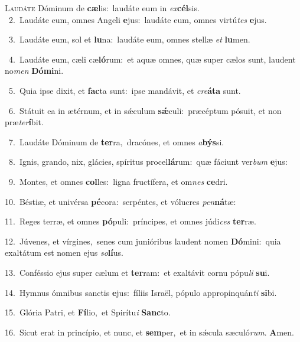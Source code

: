 \lettrine{\initial\textcolor{\initialcolor}{L}}{audáte} Dóminum de \textbf{cæ}\-lis:~\star laudáte eum in \textit{ex}\-\textbf{cél}sis.\\
{\numbfont\textcolor{\numbcolor}{~2.}}~Laudáte eum, omnes Angeli \textbf{e}\-jus:~\star laudáte eum, omnes virtú\textit{tes} \textbf{e}\-jus.\par
{\numbfont\textcolor{\numbcolor}{~3.}}~Laudáte eum, sol et \textbf{lu}\-na:~\star laudáte eum, omnes stellæ \textit{et} \textbf{lu}\-men.\par
{\numbfont\textcolor{\numbcolor}{~4.}}~Laudáte eum, cæli cæ\-\textbf{ló}\-rum:~\star et aquæ omnes, quæ super cælos sunt, laudent no\textit{men} \textbf{Dó}\-\textbf{mi}ni.\par
{\numbfont\textcolor{\numbcolor}{~5.}}~Quia ipse dixit, et \textbf{fac}\-ta sunt:~\star ipse mandávit, et \textit{cre}\-\textbf{á}\textbf{ta} sunt.\par
{\numbfont\textcolor{\numbcolor}{~6.}}~Státuit ea in ætérnum, et in sǽculum \textbf{sǽ}\-culi:~\star præcéptum pósuit, et non præ\-\textit{ter}\-\textbf{í}bit.\par
{\numbfont\textcolor{\numbcolor}{~7.}}~Laudáte Dóminum de \textbf{ter}\-ra,~\star dracónes, et omnes \textit{a}\-\textbf{býs}si.\par
{\numbfont\textcolor{\numbcolor}{~8.}}~Ignis, grando, nix, glácies, spíritus procel\-\textbf{lá}\-rum:~\star quæ fáciunt ver\textit{bum} \textbf{e}\-jus:\par
{\numbfont\textcolor{\numbcolor}{~9.}}~Montes, et omnes \textbf{col}\-les:~\star ligna fructífera, et om\textit{nes} \textbf{ce}\-dri.\par
{\numbfont\textcolor{\numbcolor}{10.}}~Béstiæ, et univérsa \textbf{pé}\-cora:~\star serpéntes, et vólucres \textit{pen}\-\textbf{ná}tæ:\par
{\numbfont\textcolor{\numbcolor}{11.}}~Reges terræ, et omnes \textbf{pó}\-puli:~\star príncipes, et omnes júdi\textit{ces} \textbf{ter}\-ræ.\par
{\numbfont\textcolor{\numbcolor}{12.}}~Júvenes, et vírgines,~\dagger senes cum junióribus laudent nomen \textbf{Dó}\-mini:~\star quia exaltátum est nomen ejus \textit{so}\-\textbf{lí}us.\par
{\numbfont\textcolor{\numbcolor}{13.}}~Conféssio ejus super cælum et \textbf{ter}\-ram:~\star et exaltávit cornu pópu\textit{li} \textbf{su}\-i.\par
{\numbfont\textcolor{\numbcolor}{14.}}~Hymnus ómnibus sanctis \textbf{e}\-jus:~\star fíliis Israël, pópulo appropinquán\textit{ti} \textbf{si}\-bi.\par
{\numbfont\textcolor{\numbcolor}{15.}}~Glória Patri, et \textbf{Fí}\-lio,~\star et Spirítu\textit{i} \textbf{Sanc}\-to.\par
{\numbfont\textcolor{\numbcolor}{16.}}~Sicut erat in princípio, et nunc, et \textbf{sem}\-per,~\star et in sǽcula sæculó\-\textit{rum}\-. \textbf{A}\-men.\par

